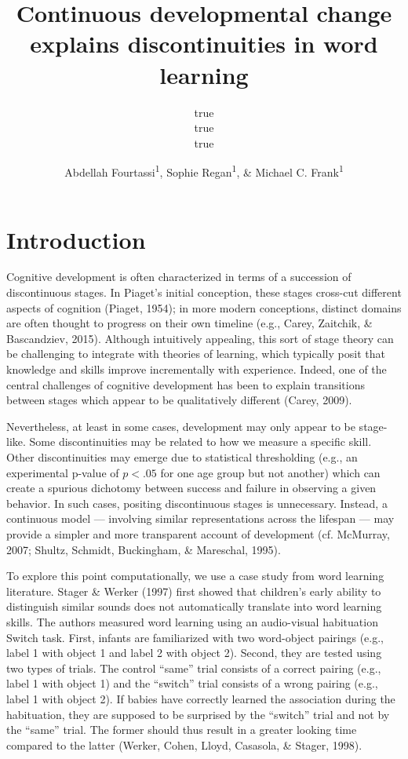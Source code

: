 \documentclass[english,,man]{apa6}
\title{Continuous developmental change explains discontinuities in word learning}
\author{true \\ true \\ true}
\date{}
\author{Abdellah Fourtassi\textsuperscript{1}, Sophie Regan\textsuperscript{1}, \& Michael C. Frank\textsuperscript{1}}
\affiliation{
\vspace{0.5cm}
\textsuperscript{1} Department of Psychology, Stanford University}
\begin{document}
\maketitle

\hypertarget{introduction}{%
\section{Introduction}\label{introduction}}

Cognitive development is often characterized in terms of a succession of discontinuous stages. In Piaget's initial conception, these stages cross-cut different aspects of cognition (Piaget, 1954); in more modern conceptions, distinct domains are often thought to progress on their own timeline (e.g., Carey, Zaitchik, \& Bascandziev, 2015). Although intuitively appealing, this sort of stage theory can be challenging to integrate with theories of learning, which typically posit that knowledge and skills improve incrementally with experience. Indeed, one of the central challenges of cognitive development has been to explain transitions between stages which appear to be qualitatively different (Carey, 2009).

Nevertheless, at least in some cases, development may only appear to be stage-like. Some discontinuities may be related to how we measure a specific skill. Other discontinuities may emerge due to statistical thresholding (e.g., an experimental p-value of \(p < .05\) for one age group but not another) which can create a spurious dichotomy between success and failure in observing a given behavior. In such cases, positing discontinuous stages is unnecessary. Instead, a continuous model --- involving similar representations across the lifespan --- may provide a simpler and more transparent account of development (cf. McMurray, 2007; Shultz, Schmidt, Buckingham, \& Mareschal, 1995).

To explore this point computationally, we use a case study from word learning literature. Stager \& Werker (1997) first showed that children's early ability to distinguish similar sounds does not automatically translate into word learning skills. The authors measured word learning using an audio-visual habituation Switch task. First, infants are familiarized with two word-object pairings (e.g., label 1 with object 1 and label 2 with object 2). Second, they are tested using two types of trials. The control \enquote{same} trial consists of a correct pairing (e.g., label 1 with object 1) and the \enquote{switch} trial consists of a wrong pairing (e.g., label 1 with object 2). If babies have correctly learned the association during the habituation, they are supposed to be surprised by the \enquote{switch} trial and not by the \enquote{same} trial. The former should thus result in a greater looking time compared to the latter (Werker, Cohen, Lloyd, Casasola, \& Stager, 1998).
\end{document}
